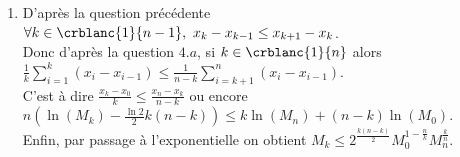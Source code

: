 \documentclass{book}
\begin{document}
\begin{enumerate}[leftmargin=*]
\begin{enumerate}[label=\alph*.]
			\begin{align*}
				&2x_k\leq x_{k-1}+x_{k+1}\\
				\iff& \ln(M_k^2)-k(n-k)\ln 2\leq \ln(M_{k-1}M_{k+1})-\frac{\ln 2}{2}((k-1)(n-k+1)+(k+1)(n-k-1))\\
				\iff& \ln(M_k^2)-k(n-k)\ln 2\leq \ln(M_{k-1}M_{k+1})-k(n-k)\ln 2-\frac{\ln 2}{2}(k-n+k-1-k+n-k-1)\\
				\iff& \ln(M_k^2)\leq \ln(M_{k-1}M_{k+1})+\ln 2
			\end{align*}
			Or en appliquant la question $3.b$ à $f^{(k-1)}$ on a $M_k\leq \sqrt{2M_{k-1}M_{k+1}}$ d'où $\ln(M_k^2)\leq \ln 2+\ln(M_{k-1}M_{k+1})$ d'où le résultat.
			\item D'après la question précédente $\forall k\in \crblanc{1}{n-1},\ x_k-x_{k-1}\leq x_{k+1}-x_k$.\\
			Donc d'après la question $4.a$, si $k\in \crblanc{1}{n}$ alors $\displaystyle\frac{1}{k}\sum_{i=1}^k(x_i-x_{i-1})\leq \frac{1}{n-k}\sum_{i=k+1}^n(x_i-x_{i-1})$.\\
			C'est à dire $\displaystyle\frac{x_k-x_0}{k}\leq \frac{x_n-x_k}{n-k}$ ou encore $\displaystyle n\left(\ln(M_k)-\frac{\ln 2}{2}k(n-k)\right)\leq k\ln(M_n)+(n-k)\ln(M_0)$.\\
			Enfin, par passage à l'exponentielle on obtient $M_k\leq 2^{\frac{k(n-k)}{2}}M_0^{1-\frac{n}{k}}M_n^{\frac{k}{n}}$.
		\end{enumerate}
	\end{enumerate}
	
\end{document}
